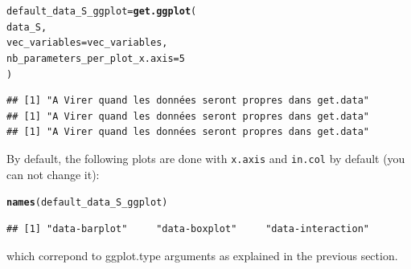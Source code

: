\documentclass{article}\usepackage[]{graphicx}\usepackage[]{color}
\makeatletter
\newcommand{\hlnum}[1]{\textcolor[rgb]{0.686,0.059,0.569}{#1}}%
\newcommand{\hlstd}[1]{\textcolor[rgb]{0.345,0.345,0.345}{#1}}%
\newcommand{\hlkwb}[1]{\textcolor[rgb]{0.69,0.353,0.396}{#1}}%
\newcommand{\hlkwc}[1]{\textcolor[rgb]{0.333,0.667,0.333}{#1}}%
\newcommand{\hlkwd}[1]{\textcolor[rgb]{0.737,0.353,0.396}{\textbf{#1}}}%
\newenvironment{kframe}{%
 \def\at@end@of@kframe{}%
 \ifinner\ifhmode%
  \def\at@end@of@kframe{\end{minipage}}%
  \begin{minipage}{\columnwidth}%
 \fi\fi%
 \def\FrameCommand##1{\hskip\@totalleftmargin \hskip-\fboxsep
 \colorbox{shadecolor}{##1}\hskip-\fboxsep
     \hskip-\linewidth \hskip-\@totalleftmargin \hskip\columnwidth}%
 \MakeFramed {\advance\hsize-\width
   \@totalleftmargin\z@ \linewidth\hsize
   \@setminipage}}%
 {\par\unskip\endMakeFramed%
 \at@end@of@kframe}
\newenvironment{knitrout}{}{} %
\makeatother
\begin{document}
\begin{knitrout}
\color{fgcolor}\begin{kframe}
\begin{alltt}
\hlstd{default_data_S_ggplot} \hlkwb{=} \hlkwd{get.ggplot}\hlstd{(}
        \hlstd{data_S,}
        \hlkwc{vec_variables} \hlstd{= vec_variables,}
        \hlkwc{nb_parameters_per_plot_x.axis} \hlstd{=} \hlnum{5}
        \hlstd{)}
\end{alltt}


{\ttfamily\noindent\itshape{}}\begin{verbatim}
## [1] "A Virer quand les données seront propres dans get.data"
## [1] "A Virer quand les données seront propres dans get.data"
## [1] "A Virer quand les données seront propres dans get.data"
\end{verbatim}
\end{kframe}
\end{knitrout}

By default, the following plots are done with \texttt{x.axis} and \texttt{in.col} by default (you can not change it):

\begin{knitrout}
\color{fgcolor}\begin{kframe}
\begin{alltt}
\hlkwd{names}\hlstd{(default_data_S_ggplot)}
\end{alltt}
\begin{verbatim}
## [1] "data-barplot"     "data-boxplot"     "data-interaction"
\end{verbatim}
\end{kframe}
\end{knitrout}

which correpond to ggplot.type arguments as explained in the previous section.
\end{document}
